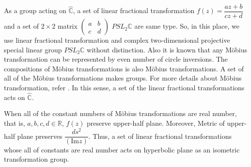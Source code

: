 As a group acting on $\hat{\mathbb{C}}$, a set of linear fractional
transformation $f(z) = \dfrac{az + b}{cz + d}$
and a set of $2 \times 2$ matrix
$\begin{pmatrix}a & b \\ c& d \end{pmatrix}$
$PSL_2\mathbb{C}$ are same type.
So, in this place, we use linear fractional transformation and
complex two-dimensional projective special linear group
$PSL_2\mathbb{C}$ without distinction.
Also it is known that any M\"obius transformation can be represented by
even number of circle inversions.
The compositions of M\"obius transformations is also M\"obius
transformations. A set of all of the M\"obius transformations makes
groups. For more details about M\"obius transformation, refer
\cite{MumfordSeriesWright200204}\cite{marden_2016}.
In this sense, a set of the linear fractional transformations acts on
$\hat{\mathbb{C}}$.

When all of the constant numbers of M\"obius transformations are real number,
that is, $a, b, c, d \in \mathbb{R}$, $f(z)$ preserve upper-half plane.
Moreover, Metric of upper-half plane preserves
$\dfrac{ds^2}{(\mathrm{Im}z)}$.
Thus, a set of linear fractional transformations whose all of constants
are real number acts on hyperbolic plane as an isometric transformation group.

